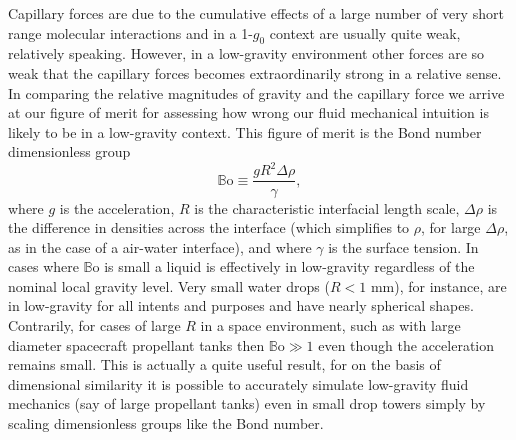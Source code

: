 \documentclass[12pt,a4paper,oneside]{book}
\begin{document}
Capillary forces are due to the cumulative effects of a large number of very short range molecular interactions and in a 1-$g_0$ context are usually quite weak, relatively speaking. However, in a low-gravity environment other forces are so weak that the capillary forces becomes extraordinarily strong in a relative sense. In comparing the relative magnitudes of gravity and the capillary force we arrive at our figure of merit for assessing how wrong our fluid mechanical intuition is likely to be in a low-gravity context. This figure of merit is the Bond number dimensionless group
\[ \mathbb{B}\mbox{o} \equiv \frac{g R^2 \Delta \rho}{\gamma}, 
\]
where $g$ is the acceleration, $R$ is the characteristic interfacial length scale, $\Delta \rho$ is the difference in densities across the interface (which simplifies to $\rho$, for large $\Delta \rho$, as in the case of a air-water interface), and where $\gamma$ is the surface tension. In cases where $\mathbb{B}\mbox{o}$ is small a liquid is effectively in low-gravity regardless of the nominal local gravity level. Very small water drops ($R < 1$ mm), for instance, are in low-gravity for all intents and purposes and have nearly spherical shapes. Contrarily, for cases of large $R$ in a space environment, such as with large diameter spacecraft propellant tanks then $ \mathbb{B}\mbox{o} \gg 1$ even though the acceleration remains small. This is actually a quite useful result, for on the basis of dimensional similarity it is possible to accurately simulate low-gravity fluid mechanics (say of large propellant tanks) even in small drop towers simply by scaling dimensionless groups like the Bond number. 
\end{document}
